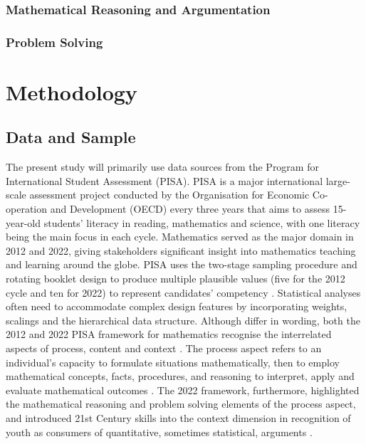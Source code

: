 \documentclass[
    a4paper,                %
    11pt,                   %
    stu,                    %
    donotrepeattitle,       %
    floatsintext,           %
    biblatex,               %
    colorlinks=true,        %
    linkcolor=red,          %
    anchorcolor=black,      %
    citecolor=blue,         %
    urlcolor=blue,          %
    bookmarks=true,         %
    bookmarksopen=false,    %
    bookmarksnumbered=true, %
    dvipsnames              %
]{apa7}
\begin{document}
\subsubsection{Mathematical Reasoning and Argumentation}

\subsubsection{Problem Solving}

\section{Methodology}

\subsection{Data and Sample}

The present study will primarily use data sources from the Program for International Student Assessment (PISA). PISA is a major international large-scale assessment project conducted by the Organisation for Economic Co-operation and Development (OECD) every three years that aims to assess 15-year-old students' literacy in reading, mathematics and science, with one literacy being the main focus in each cycle. Mathematics served as the major domain in 2012 and 2022, giving stakeholders significant insight into mathematics teaching and learning around the globe. PISA uses the two-stage sampling procedure and rotating booklet design to produce multiple plausible values (five for the 2012 cycle and ten for 2022) to represent candidates' competency \parencite{rust:2014}. Statistical analyses often need to accommodate complex design features by incorporating weights, scalings and the hierarchical data structure. Although differ in wording, both the 2012 and 2022 PISA framework for mathematics recognise the interrelated aspects of process, content and context \parencite{oecd:2013}. The process aspect refers to an individual's capacity to formulate situations mathematically, then to employ mathematical concepts, facts, procedures, and reasoning to interpret, apply and evaluate mathematical outcomes \parencite[][p. 28]{oecd:2013}. The 2022 framework, furthermore, highlighted the mathematical reasoning and problem solving elements of the process aspect, and introduced 21st Century skills into the context dimension in recognition of youth as consumers of quantitative, sometimes statistical, arguments \parencite{oecd:2018}.
\end{document}
